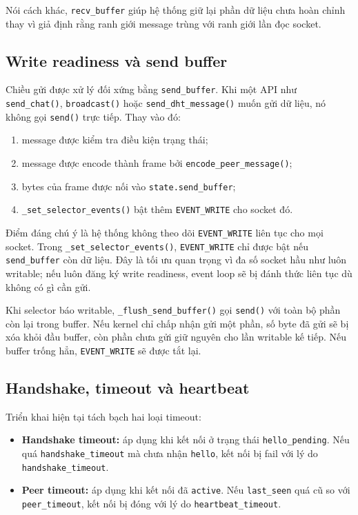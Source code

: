 Nói cách khác, \texttt{recv\_buffer} giúp hệ thống giữ lại phần dữ liệu chưa hoàn chỉnh thay vì giả định rằng ranh giới message trùng với ranh giới lần đọc socket.

\subsection{Write readiness và send buffer}
Chiều gửi được xử lý đối xứng bằng \texttt{send\_buffer}. Khi một API như \texttt{send\_chat()}, \texttt{broadcast()} hoặc \texttt{send\_dht\_message()} muốn gửi dữ liệu, nó không gọi \texttt{send()} trực tiếp. Thay vào đó:
\begin{enumerate}[leftmargin=2em]
    \item message được kiểm tra điều kiện trạng thái;
    \item message được encode thành frame bởi \texttt{encode\_peer\_message()};
    \item bytes của frame được nối vào \texttt{state.send\_buffer};
    \item \texttt{\_set\_selector\_events()} bật thêm \texttt{EVENT\_WRITE} cho socket đó.
\end{enumerate}

Điểm đáng chú ý là hệ thống không theo dõi \texttt{EVENT\_WRITE} liên tục cho mọi socket. Trong \texttt{\_set\_selector\_events()}, \texttt{EVENT\_WRITE} chỉ được bật nếu \texttt{send\_buffer} còn dữ liệu. Đây là tối ưu quan trọng vì đa số socket hầu như luôn writable; nếu luôn đăng ký write readiness, event loop sẽ bị đánh thức liên tục dù không có gì cần gửi.

Khi selector báo writable, \texttt{\_flush\_send\_buffer()} gọi \texttt{send()} với toàn bộ phần còn lại trong buffer. Nếu kernel chỉ chấp nhận gửi một phần, số byte đã gửi sẽ bị xóa khỏi đầu buffer, còn phần chưa gửi giữ nguyên cho lần writable kế tiếp. Nếu buffer trống hẳn, \texttt{EVENT\_WRITE} sẽ được tắt lại.

\subsection{Handshake, timeout và heartbeat}
Triển khai hiện tại tách bạch hai loại timeout:
\begin{itemize}[leftmargin=2em]
    \item \textbf{Handshake timeout:} áp dụng khi kết nối ở trạng thái \texttt{hello\_pending}. Nếu quá \texttt{handshake\_timeout} mà chưa nhận \texttt{hello}, kết nối bị fail với lý do \texttt{handshake\_timeout}.
    \item \textbf{Peer timeout:} áp dụng khi kết nối đã \texttt{active}. Nếu \texttt{last\_seen} quá cũ so với \texttt{peer\_timeout}, kết nối bị đóng với lý do \texttt{heartbeat\_timeout}.
\end{itemize}

